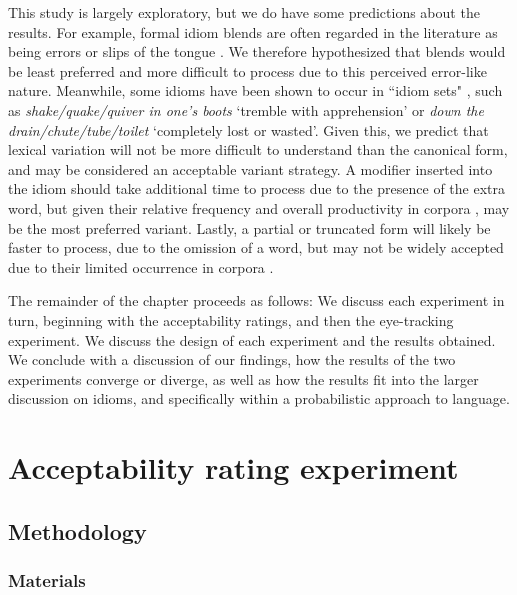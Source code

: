 \documentclass[output=paper,modfonts,nonflat]{langsci/langscibook}
\begin{document}
This study is largely exploratory, but we do have some predictions about the results. For example, formal idiom blends are often regarded in the literature as being errors or slips of the tongue \citep{Fay1982, CuttingBock1997}. We therefore hypothesized that blends would be least preferred and more difficult to process due to this perceived error-like nature. Meanwhile, some idioms have been shown to occur in ``idiom sets" \citep{Moon1998}, such as \textit{shake/quake/quiver in one's boots} `tremble with apprehension' or \textit{down the drain/chute/tube/toilet} `completely lost or wasted'. Given this, we predict that lexical variation will not be more difficult to understand than the canonical form, and may be considered an acceptable variant strategy. A modifier inserted into the idiom should take additional time to process due to the presence of the extra word, but given their relative frequency and overall productivity in corpora \citep{Moon1998, Schroder2013}, may be the most preferred variant. Lastly, a partial or truncated form will likely be faster to process, due to the omission of a word, but may not be widely accepted due to their limited occurrence in corpora \citep{Moon1998}.

The remainder of the chapter proceeds as follows: We discuss each experiment in turn, beginning with the acceptability ratings, and then the eye-tracking experiment. We discuss the design of each experiment and the results obtained. We conclude with a discussion of our findings, how the results of the two experiments converge or diverge,  as well as how the results fit into the larger discussion on idioms, and specifically within a probabilistic approach to language.




\section{Acceptability rating experiment}

\subsection{Methodology}
\subsubsection{Materials}
\end{document}
